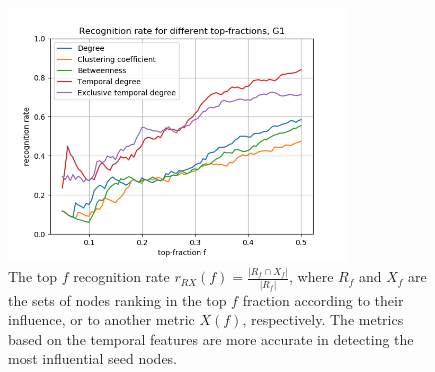 \documentclass[letterpaper]{article}
\begin{document}
\begin{figure}[ht!]
  \centering
   \includegraphics[width=0.8\textwidth]{img/rankG.png}
   \caption{The top $f$ recognition rate $r_{RX}(f) = \frac{ |R_f \cap X_f| }{ |R_f| }$, where $R_f$ and $X_f$ are the sets of nodes ranking in the top $f$ fraction according to their influence,  or to another metric $X(f)$, respectively. The metrics based on the temporal features are more accurate in detecting the most influential seed nodes.}
   \label{fig:rankG}
\end{figure}
\end{document}
